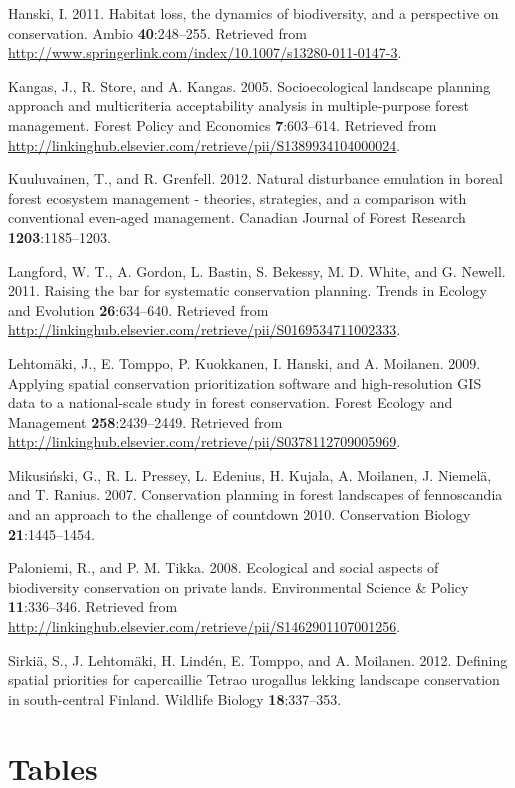\documentclass[]{article}
\begin{document}
Hanski, I. 2011. Habitat loss, the dynamics of biodiversity, and a
perspective on conservation. Ambio \textbf{40}:248--255. Retrieved from
\url{http://www.springerlink.com/index/10.1007/s13280-011-0147-3}.

Kangas, J., R. Store, and A. Kangas. 2005. Socioecological landscape
planning approach and multicriteria acceptability analysis in
multiple-purpose forest management. Forest Policy and Economics
\textbf{7}:603--614. Retrieved from
\url{http://linkinghub.elsevier.com/retrieve/pii/S1389934104000024}.

Kuuluvainen, T., and R. Grenfell. 2012. Natural disturbance emulation in
boreal forest ecosystem management - theories, strategies, and a
comparison with conventional even-aged management. Canadian Journal of
Forest Research \textbf{1203}:1185--1203.

Langford, W. T., A. Gordon, L. Bastin, S. Bekessy, M. D. White, and G.
Newell. 2011. Raising the bar for systematic conservation planning.
Trends in Ecology and Evolution \textbf{26}:634--640. Retrieved from
\url{http://linkinghub.elsevier.com/retrieve/pii/S0169534711002333}.

Lehtomäki, J., E. Tomppo, P. Kuokkanen, I. Hanski, and A. Moilanen.
2009. Applying spatial conservation prioritization software and
high-resolution GIS data to a national-scale study in forest
conservation. Forest Ecology and Management \textbf{258}:2439--2449.
Retrieved from
\url{http://linkinghub.elsevier.com/retrieve/pii/S0378112709005969}.

Mikusiński, G., R. L. Pressey, L. Edenius, H. Kujala, A. Moilanen, J.
Niemelä, and T. Ranius. 2007. Conservation planning in forest landscapes
of fennoscandia and an approach to the challenge of countdown 2010.
Conservation Biology \textbf{21}:1445--1454.

Paloniemi, R., and P. M. Tikka. 2008. Ecological and social aspects of
biodiversity conservation on private lands. Environmental Science \&
Policy \textbf{11}:336--346. Retrieved from
\url{http://linkinghub.elsevier.com/retrieve/pii/S1462901107001256}.

Sirkiä, S., J. Lehtomäki, H. Lindén, E. Tomppo, and A. Moilanen. 2012.
Defining spatial priorities for capercaillie Tetrao urogallus lekking
landscape conservation in south-central Finland. Wildlife Biology
\textbf{18}:337--353.

\section{Tables}
\end{document}
